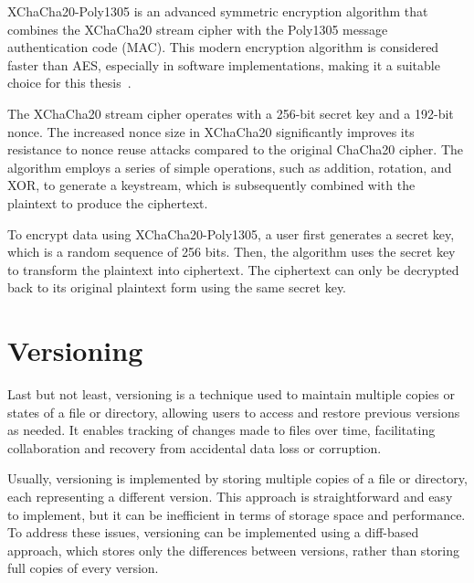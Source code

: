 XChaCha20-Poly1305 is an advanced symmetric encryption algorithm that combines the XChaCha20 stream cipher with the Poly1305 message authentication code (MAC).
This modern encryption algorithm is considered faster than AES, especially in software implementations, making it a suitable choice for this thesis~\cite{crypto_pp_xchacha20poly1305}.

The XChaCha20 stream cipher operates with a 256-bit secret key and a 192-bit nonce.
The increased nonce size in XChaCha20 significantly improves its resistance to nonce reuse attacks compared to the original ChaCha20 cipher.
The algorithm employs a series of simple operations, such as addition, rotation, and XOR, to generate a keystream, which is subsequently combined with the plaintext to produce the ciphertext.

To encrypt data using XChaCha20-Poly1305, a user first generates a secret key, which is a random sequence of 256 bits.
Then, the algorithm uses the secret key to transform the plaintext into ciphertext.
The ciphertext can only be decrypted back to its original plaintext form using the same secret key.


\section{Versioning}\label{sec:versioning}

Last but not least, versioning is a technique used to maintain multiple copies or states of a file or directory, allowing users to access and restore previous versions as needed.
It enables tracking of changes made to files over time, facilitating collaboration and recovery from accidental data loss or corruption.

Usually, versioning is implemented by storing multiple copies of a file or directory, each representing a different version.
This approach is straightforward and easy to implement, but it can be inefficient in terms of storage space and performance.
To address these issues, versioning can be implemented using a diff-based approach, which stores only the differences between versions, rather than storing full copies of every version.
